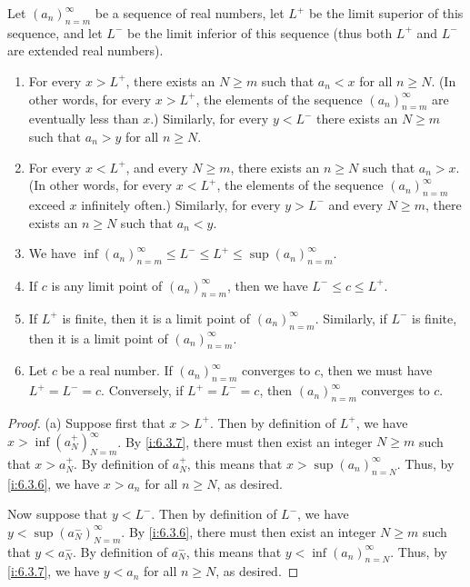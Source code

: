 \begin{prop}\label{i:6.4.12}
  Let \((a_n)_{n = m}^\infty\) be a sequence of real numbers, let \(L^+\) be the limit superior of this sequence, and let \(L^-\) be the limit inferior of this sequence
  (thus both \(L^+\) and \(L^-\) are extended real numbers).
  \begin{enumerate}
    \item For every \(x > L^+\), there exists an \(N \geq m\) such that \(a_n < x\) for all \(n \geq N\).
          (In other words, for every \(x > L^+\), the elements of the sequence \((a_n)_{n = m}^\infty\) are eventually less than \(x\).)
          Similarly, for every \(y < L^-\) there exists an \(N \geq m\) such that \(a_n > y\) for all \(n \geq N\).
    \item For every \(x < L^+\), and every \(N \geq m\), there exists an \(n \geq N\) such that \(a_n > x\).
          (In other words, for every \(x < L^+\), the elements of the sequence \((a_n)_{n = m}^\infty\) exceed \(x\) infinitely often.)
          Similarly, for every \(y > L^-\) and every \(N \geq m\), there exists an \(n \geq N\) such that \(a_n < y\).
    \item We have \(\inf(a_n)_{n = m}^\infty \leq L^- \leq L^+ \leq \sup(a_n)_{n = m}^\infty\).
    \item If \(c\) is any limit point of \((a_n)_{n = m}^\infty\), then we have \(L^- \leq c \leq L^+\).
    \item If \(L^+\) is finite, then it is a limit point of \((a_n)_{n = m}^\infty\).
          Similarly, if \(L^-\) is finite, then it is a limit point of \((a_n)_{n = m}^\infty\).
    \item Let \(c\) be a real number.
          If \((a_n)_{n = m}^\infty\) converges to \(c\), then we must have \(L^+ = L^- = c\).
          Conversely, if \(L^+ = L^- = c\), then \((a_n)_{n = m}^\infty\) converges to \(c\).
  \end{enumerate}
\end{prop}

\begin{proof}{(a)}
  Suppose first that \(x > L^+\).
  Then by definition of \(L^+\), we have \(x > \inf(a_N^+)_{N = m}^\infty\).
  By \cref{i:6.3.7}, there must then exist an integer \(N \geq m\) such that \(x > a_N^+\).
  By definition of \(a_N^+\), this means that \(x > \sup(a_n)_{n = N}^\infty\).
  Thus, by \cref{i:6.3.6}, we have \(x > a_n\) for all \(n \geq N\), as desired.

  Now suppose that \(y < L^-\).
  Then by definition of \(L^-\), we have \(y < \sup(a_N^-)_{N = m}^\infty\).
  By \cref{i:6.3.6}, there must then exist an integer \(N \geq m\) such that \(y < a_N^-\).
  By definition of \(a_N^-\), this means that \(y < \inf(a_n)_{n = N}^\infty\).
  Thus, by \cref{i:6.3.7}, we have \(y < a_n\) for all \(n \geq N\), as desired.
\end{proof}

